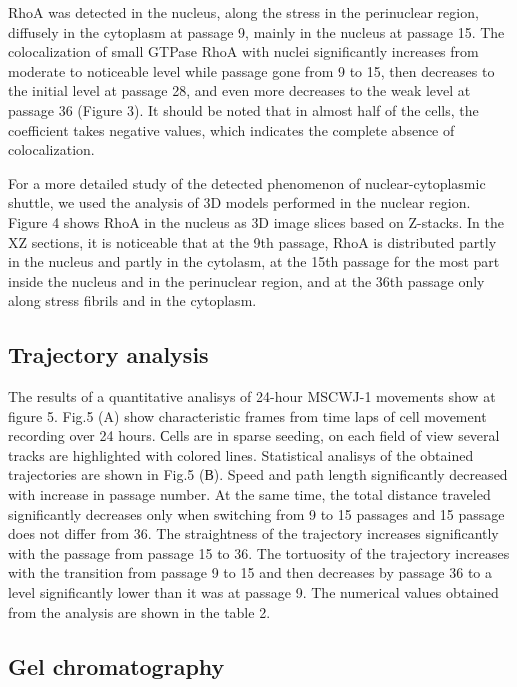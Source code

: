 \documentclass[alpha-refs]{wiley-article}
\begin{document}
RhoA was detected in the nucleus, along the stress in the perinuclear region, diffusely in the cytoplasm at passage 9, mainly in the nucleus at passage 15.
The colocalization of small GTPase RhoA with nuclei significantly increases from moderate to noticeable level while passage gone from 9 to 15, then decreases to the initial level at passage 28, and even more decreases to the weak level at passage 36 (Figure 3).
It should be noted that in almost half of the cells, the coefficient takes negative values, which indicates the complete absence of colocalization.

For a more detailed study of the detected phenomenon of nuclear-cytoplasmic shuttle, we used the analysis of 3D models performed in the nuclear region.
Figure 4 shows RhoA in the nucleus as 3D image slices based on Z-stacks.
In the XZ sections, it is noticeable that at the 9th passage, RhoA is distributed partly in the nucleus and partly in the cytolasm, at the 15th passage for the most part inside the nucleus and in the perinuclear region, and at the 36th passage only along stress fibrils and in the cytoplasm.

\subsection{Trajectory analysis}

The results of a quantitative analisys of 24-hour MSCWJ-1 movements show at figure 5.
Fig.5 (A) show characteristic frames from time laps of cell movement recording over 24 hours.
Сells are in sparse seeding, on each field of view several tracks are highlighted with colored lines.
Statistical analisys of the obtained trajectories are shown in Fig.5 (В).
Speed and path length significantly decreased with increase in passage number.
At the same time, the total distance traveled significantly decreases only when switching from 9 to 15 passages and 15 passage does not differ from 36.
The straightness of the trajectory increases significantly with the passage from passage 15 to 36.
The tortuosity of the trajectory increases with the transition from passage 9 to 15 and then decreases by passage 36 to a level significantly lower than it was at passage 9.
The numerical values obtained from the analysis are shown in the table 2.

\subsection{Gel chromatography}
\end{document}
